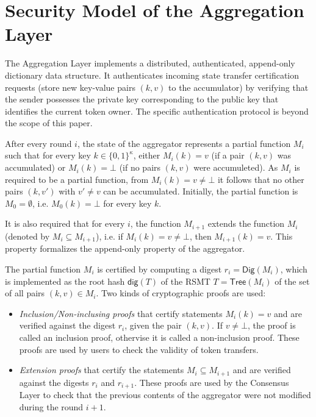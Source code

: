 \documentclass[twocolumn]{article}
\begin{document}
\section{Security Model of the Aggregation Layer}

The Aggregation Layer implements a distributed, authenticated, append-only dictionary data structure. It authenticates incoming state transfer certification requests (store new key-value pairs $(k,v)$ to the accumulator) by verifying that the sender possesses the private key corresponding to the public key that identifies the current token owner. The specific authentication protocol is beyond the scope of this paper.

After every round $i$, the state of the aggregator represents a partial function $M_i$ such that for every key $k\in\{0,1\}^\kappa$,
either $M_i(k)=v$ (if a pair $(k,v)$ was accumulated) or $M_i(k)=\bot$ (if no pairs $(k,v)$ were accumuleted). As $M_i$ is required to be a partial function, from $M_i(k)=v\neq\bot$ it follows that no other pairs $(k,v')$ with $v'\neq v$ can be accumulated. Initially, the partial function is $M_0=\emptyset$, i.e. $M_0(k)=\bot$ for every key $k$.

It is also required that for every $i$, the function $M_{i+1}$ extends the function $M_i$ (denoted by $M_i\subseteq M_{i+1}$), i.e. if $M_i(k)=v\neq\bot$, then $M_{i+1}(k)=v$. This property formalizes the append-only property of the aggregator.

The partial function $M_i$ is certified by computing a digest $r_i=\mathsf{Dig}(M_i)$, which is implemented as the root hash $\mathsf{dig}(T)$ of the RSMT $T=\mathsf{Tree}(M_i)$ of the set of all pairs $(k,v)\in M_i$. Two kinds of cryptographic proofs are used:
\begin{itemize}
\item \emph{Inclusion/Non-inclusing proofs} that certify statements $M_i(k)=v$ and are verified against the digest $r_i$, given the pair $(k,v)$. If $v\neq\bot$, the proof is called an inclusion proof, othervise it is called a non-inclusion proof. These proofs are used by users to check the validity of token transfers.
\item \emph{Extension proofs} that certify the statements $M_i\subseteq M_{i+1}$ and are verified against the digests $r_i$ and $r_{i+1}$. These proofs are used by the Consensus Layer to check that the previous contents of the aggregator were not modified during the round $i+1$.
\end{itemize}
\end{document}
